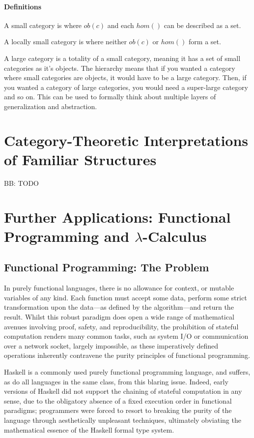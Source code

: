 \documentclass[10pt,a4paper]{amsart}
\begin{document}
\paragraph{Definitions}
A small category is where $ob(c)$ and each $hom()$ can be described as a set.

A locally small category is where neither $ob(c)$ or $hom()$ form a set. 

A large category is a totality of a small category, meaning it has a set of small categories as it's objects.
The hierarchy means that if you wanted a category where small categories are objects,
it would have to be a large category.
Then, if you wanted a category of large categories, you would need a super-large category and so on.
This can be used to formally think about multiple layers of generalization and abstraction.
\section{Category-Theoretic %
        Interpretations of Familiar Structures}
BB: TODO

\section{Further Applications: %
        Functional Programming and \texorpdfstring{$\lambda$}{Lambda}-Calculus}
\subsection{Functional Programming: The Problem} In purely functional languages,
there is no allowance for context, or mutable variables of any kind. Each
function must accept some data, perform some strict transformation upon the
data---as defined by the algorithm---and return the result. Whilst this robust
paradigm does open a wide range of mathematical avenues involving proof, safety,
and reproducibility, the prohibition of stateful computation renders many common
tasks, such as system I/O or communication over a network socket, largely
impossible, as these imperatively defined operations inherently contravene the
purity principles of functional programming.

Haskell is a commonly used purely functional programming language, and
suffers, as do all languages in the same class, from this blaring issue.
Indeed, early versions of Haskell did not support the chaining of stateful
computation in any sense, due to the obligatory absence of a fixed execution
order in functional paradigms; programmers were forced to resort to breaking the
purity of the language through aesthetically unpleasant techniques, ultimately
obviating the mathematical essence of the Haskell formal type system.
\end{document}
